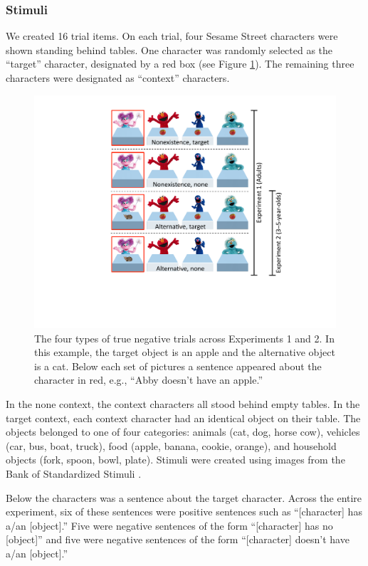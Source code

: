 \documentclass[man, noapacite]{apa2}
\begin{document}
\subsubsection{Stimuli}

We created 16 trial items. On each trial, four Sesame Street characters were shown standing behind tables. One character was randomly selected as the ``target'' character, designated by a red box (see Figure \ref{fig:trial}). The remaining three characters were designated as ``context'' characters.


\begin{figure}[t]
\begin{center}
\includegraphics[width=4.5in]{figures/trialtypes.pdf}
\caption{\label{fig:trial} The four types of true negative trials across Experiments 1 and 2. In this example, the target object is an apple and the alternative object is a cat. Below each set of pictures a sentence appeared about the character in red, e.g., ``Abby doesn't have an apple.'' }
\end{center}
\end{figure}

In the none context, the context characters all stood behind empty tables. In the target context, each context character had an identical object on their table. The objects belonged to one of four categories: animals (cat, dog, horse cow), vehicles (car, bus, boat, truck), food (apple, banana, cookie, orange), and household objects (fork, spoon, bowl, plate). Stimuli were created using images from the Bank of Standardized Stimuli \cite{brodeur2010}.

Below the characters was a sentence about the target character. Across the entire experiment, six of these sentences were positive sentences such as ``[character] has a/an [object].'' Five were negative sentences of the form ``[character] has no [object]'' and five were negative sentences of the form ``[character] doesn't have a/an [object].''
\end{document}
